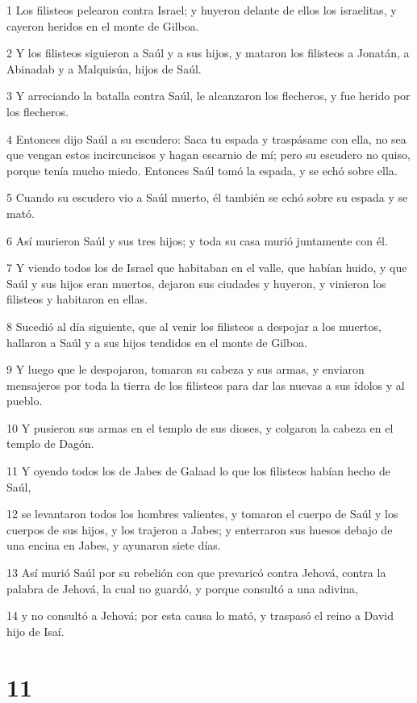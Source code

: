 \par 1 Los filisteos pelearon contra Israel; y huyeron delante de ellos los israelitas, y cayeron heridos en el monte de Gilboa.
\par 2 Y los filisteos siguieron a Saúl y a sus hijos, y mataron los filisteos a Jonatán, a Abinadab y a Malquisúa, hijos de Saúl.
\par 3 Y arreciando la batalla contra Saúl, le alcanzaron los flecheros, y fue herido por los flecheros.
\par 4 Entonces dijo Saúl a su escudero: Saca tu espada y traspásame con ella, no sea que vengan estos incircuncisos y hagan escarnio de mí; pero su escudero no quiso, porque tenía mucho miedo. Entonces Saúl tomó la espada, y se echó sobre ella.
\par 5 Cuando su escudero vio a Saúl muerto, él también se echó sobre su espada y se mató.
\par 6 Así murieron Saúl y sus tres hijos; y toda su casa murió juntamente con él.
\par 7 Y viendo todos los de Israel que habitaban en el valle, que habían huido, y que Saúl y sus hijos eran muertos, dejaron sus ciudades y huyeron, y vinieron los filisteos y habitaron en ellas.
\par 8 Sucedió al día siguiente, que al venir los filisteos a despojar a los muertos, hallaron a Saúl y a sus hijos tendidos en el monte de Gilboa.
\par 9 Y luego que le despojaron, tomaron su cabeza y sus armas, y enviaron mensajeros por toda la tierra de los filisteos para dar las nuevas a sus ídolos y al pueblo.
\par 10 Y pusieron sus armas en el templo de sus dioses, y colgaron la cabeza en el templo de Dagón.
\par 11 Y oyendo todos los de Jabes de Galaad lo que los filisteos habían hecho de Saúl,
\par 12 se levantaron todos los hombres valientes, y tomaron el cuerpo de Saúl y los cuerpos de sus hijos, y los trajeron a Jabes; y enterraron sus huesos debajo de una encina en Jabes, y ayunaron siete días.
\par 13 Así murió Saúl por su rebelión con que prevaricó contra Jehová, contra la palabra de Jehová, la cual no guardó, y porque consultó a una adivina, 
\par 14 y no consultó a Jehová; por esta causa lo mató, y traspasó el reino a David hijo de Isaí.

\chapter{11}


